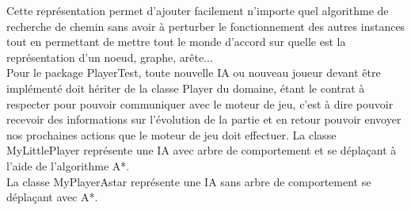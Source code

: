 Cette représentation permet d'ajouter facilement n'importe quel algorithme de recherche de chemin sans avoir à perturber le fonctionnement des autres instances tout en permettant de mettre tout le monde d'accord sur quelle est la représentation d'un noeud, graphe, arête...
\\

Pour le package PlayerTest, toute nouvelle IA ou nouveau joueur devant être implémenté doit hériter de la classe Player du domaine, étant le contrat à respecter pour pouvoir communiquer avec le moteur de jeu, c'est à dire pouvoir recevoir des informations sur l'évolution de la partie et en retour pouvoir envoyer nos prochaines actions que le moteur de jeu doit effectuer.
La classe MyLittlePlayer représente une IA avec arbre de comportement et se déplaçant à l'aide de l'algorithme A*.\\
La classe MyPlayerAstar représente une IA sans arbre de comportement se déplaçant avec A*.
